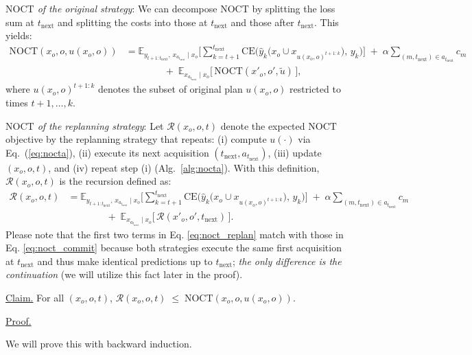 \textit{$\mathrm{NOCT}$ of the original strategy}: We can decompose $\mathrm{NOCT}$ by splitting the
loss sum at $t_{\text{next}}$ and splitting the costs into those at $t_{\text{next}}$
and those after $t_{\text{next}}$. This yields:
\begin{align}
\mathrm{NOCT}(x_o,o,u(x_o,o))
&=
\mathbb{E}_{y_{t+1:t_{\text{next}}},\,x_{a_{t_{\text{next}}}} \mid x_o}
\Bigg[
\sum_{k=t+1}^{t_{\text{next}}}
\mathrm{CE}\!\Big(\hat y_k\big(x_o \cup x_{u(x_o,o)^{t+1:k}}\big),\,y_k\Big)
\Bigg]
\;+\;\alpha \sum_{(m,t_{\text{next}})\in a_{t_{\text{next}}}} c_m
\nonumber\\
&\qquad\qquad
+\;\mathbb{E}_{x_{a_{t_{\text{next}}}} \mid x_o}\Big[\,\mathrm{NOCT}(x'_o,o',\tilde u)\,\Big],
\label{eq:noct_commit}
\end{align}
where $u(x_o,o)^{t+1:k}$ denotes the subset of original plan $u(x_o,o)$ restricted to times
$t+1,\ldots,k$.

\textit{$\mathrm{NOCT}$ of the replanning strategy}: Let $\mathcal{R}(x_o,o,t)$ denote the expected $\mathrm{NOCT}$ objective by the replanning strategy that repeats:
(i) compute $u(\cdot)$ via Eq.~(\ref{eq:nocta}), (ii) execute its next acquisition $(t_{\text{next}},a_{t_{\text{next}}})$,
 (iii) update $(x_o,o,t)$, and (iv) repeat step (i) (Alg.~\ref{alg:nocta}).
With this definition, $\mathcal{R}(x_o,o,t)$ is the recursion defined as:
\begin{align}
\mathcal{R}(x_o,o,t)
&=
\mathbb{E}_{y_{t+1:t_{\text{next}}},\,x_{a_{t_{\text{next}}}} \mid x_o}
\Bigg[
\sum_{k=t+1}^{t_{\text{next}}}
\mathrm{CE}\!\Big(\hat y_k\big(x_o \cup x_{u(x_o,o)^{t+1:k}}\big),\,y_k\Big)
\Bigg]
\;+\;\alpha \sum_{(m,t_{\text{next}})\in a_{t_{\text{next}}}} c_m
\nonumber\\
&\qquad\qquad
+\;\mathbb{E}_{x_{a_{t_{\text{next}}}} \mid x_o}\Big[\,\mathcal{R}(x'_o,o',t_{\text{next}})\,\Big].
\label{eq:noct_replan}
\end{align}
Please note that the first two terms in Eq. \eqref{eq:noct_replan} match with those in Eq. \eqref{eq:noct_commit} because both
strategies execute the same first acquisition at $t_{\text{next}}$ and thus
make identical predictions up to $t_{\text{next}}$; \textit{the only difference is the continuation} (we will utilize this fact later in the proof).

\uline{Claim.} For all $(x_o,o,t)$, $\mathcal{R}(x_o,o,t)\;\le\;\mathrm{NOCT}(x_o,o,u(x_o,o)).$


\uline{Proof.} 

We will prove this with backward induction. 

